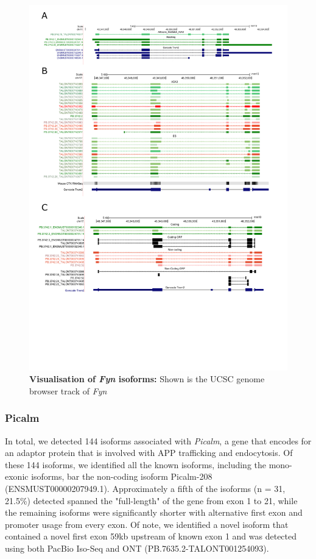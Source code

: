 \begin{landscape}
	\begin{figure}[htp]
		\begin{center}
			\includegraphics[page=14,trim={0 5cm 0 0},scale = 0.85]{Figures/pdfjoiner.pdf}
		\end{center}
		\captionsetup{width=1.5\textwidth}
		\caption[Visualisation of \textit{Fyn} isoforms]%
		{\textbf{Visualisation of \textit{Fyn} isoforms:} Shown is the UCSC genome browser track of \textit{Fyn}}   
		\label{fig:fyn_track}
	\end{figure}
\end{landscape}


\subsubsection{Picalm}
In total, we detected 144 isoforms associated with \textit{Picalm}, a gene that encodes for an adaptor protein that is involved with APP trafficking and endocytosis. Of these 144 isoforms, we identified all the known isoforms, including the mono-exonic isoforms, bar the non-coding isoform Picalm-208	 (ENSMUST00000207949.1). Approximately a fifth of the isoforms (n = 31, 21.5\%) detected spanned the "full-length" of the gene from exon 1 to 21, while the remaining isoforms were significantly shorter with alternative first exon and promoter usage from every exon. Of note, we identified a novel isoform that contained a novel first exon 59kb upstream of known exon 1 and was detected using both PacBio Iso-Seq and ONT (PB.7635.2-TALONT001254093).
	

